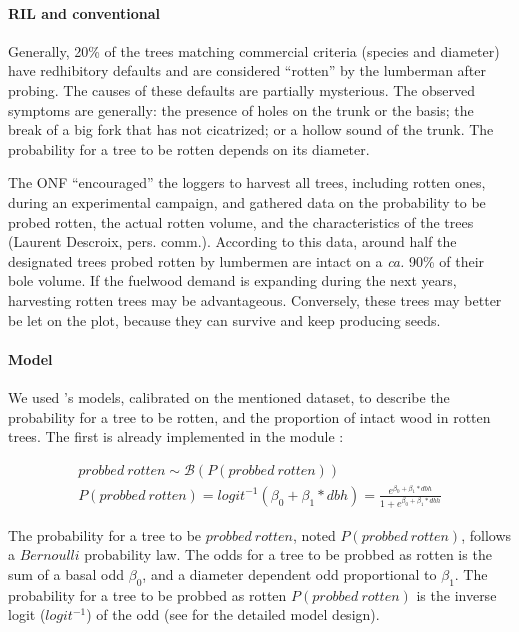 \documentclass[12pt,]{article}
\theoremstyle{definition}
\theoremstyle{definition}
\theoremstyle{definition}
\theoremstyle{remark}
\begin{document}
\paragraph{RIL and conventional}\label{ril-and-conventional}

Generally, 20\% of the trees matching commercial criteria (species and
diameter) have redhibitory defaults and are considered ``rotten'' by the
lumberman after probing. The causes of these defaults are partially
mysterious. The observed symptoms are generally: the presence of holes
on the trunk or the basis; the break of a big fork that has not
cicatrized; or a hollow sound of the trunk. The probability for a tree
to be rotten depends on its diameter.

The ONF ``encouraged'' the loggers to harvest all trees, including
rotten ones, during an experimental campaign, and gathered data on the
probability to be probed rotten, the actual rotten volume, and the
characteristics of the trees (Laurent Descroix, pers. comm.). According
to this data, around half the designated trees probed rotten by
lumbermen are intact on a \emph{ca.} 90\% of their bole volume. If the
fuelwood demand is expanding during the next years, harvesting rotten
trees may be advantageous. Conversely, these trees may better be let on
the plot, because they can survive and keep producing seeds.

\paragraph{Model}\label{model-2}

We used \citet{Schmitt2017}'s models, calibrated on the mentioned
dataset, to describe the probability for a tree to be rotten, and the
proportion of intact wood in rotten trees. The first is already
implemented in the module :

\begin{equation}
  \begin{array}{c} 
    probbed~rotten \sim \mathcal{B}(P(probbed~rotten)) \\
    P(probbed~rotten) = logit^{-1}(\beta_0 + \beta_1*dbh) = \frac{e^{\beta_0 + \beta_1*dbh}}{1 + e^{\beta_0 + \beta_1*dbh}}
  \end{array}
  \label{eq:rotten}
\end{equation}

The probability for a tree to be \(probbed~rotten\), noted
\(P(probbed~rotten)\), follows a \(Bernoulli\) probability law. The odds
for a tree to be probbed as rotten is the sum of a basal odd
\(\beta_0\), and a diameter dependent odd proportional to \(\beta_1\).
The probability for a tree to be probbed as rotten \(P(probbed~rotten)\)
is the inverse logit (\(logit^{-1}\)) of the odd (see
\citet{Schmitt2017} for the detailed model design).
\end{document}
